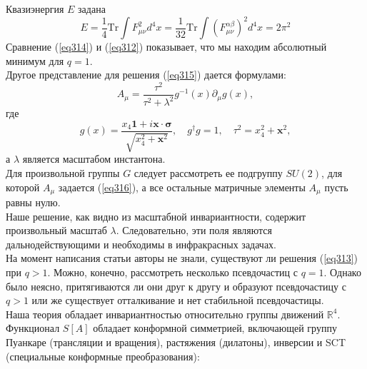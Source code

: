 \documentclass[12pt]{article}
\theoremstyle{definition}
\begin{document}
Квазиэнергия $E$ задана
\begin{equation}\label{eq314}
    E=\frac{1}{4}\text{Tr}\int F^2_{\mu\nu}d^4x=\frac{1}{32}\text{Tr}\int(F^{\alpha\beta}_{\mu\nu})^2d^4x=2\pi^2
\end{equation}
Сравнение (\ref{eq314}) и (\ref{eq312}) показывает, что мы находим абсолютный минимум для $q = 1$.\\
Другое представление для решения (\ref{eq315}) дается формулами:
\begin{equation}\label{eq316}
    A_\mu=\frac{\tau^2}{\tau^2+\lambda^2}g^{-1}(x)\partial_\mu g(x),
\end{equation}
где
\begin{equation}
    g(x)=\frac{x_4\bm{1}+i\bm{x}\cdot\bm{\sigma}}{\sqrt{x_4^2+\bm{x}^2}},\quad g^\dagger g=1,\quad\tau^2=x_4^2+\bm{x}^2,
\end{equation}
а $\lambda$ является масштабом инстантона.\\
Для произвольной группы $G$ следует рассмотреть ее подгруппу $SU(2)$, для которой $A_\mu$ задается (\ref{eq316}), а все остальные матричные элементы $A_\mu$ пусть равны нулю.\\
Наше решение, как видно из масштабной инвариантности, содержит произвольный масштаб $\lambda$. Следовательно, эти поля являются дальнодействующими и необходимы в инфракрасных задачах.\\
На момент написания статьи авторы не знали, существуют ли решения (\ref{eq313}) при $q > 1$. Можно, конечно, рассмотреть несколько псевдочастиц с $q = 1$. Однако было неясно, притягиваются ли они друг к другу и образуют псевдочастицу с $q > 1$ или же существует отталкивание и нет стабильной псевдочастицы.\\
Наша теория обладает инвариантностью относительно группы движений $\mathbb{R}^4$. Функционал $S[A]$ обладает конформной симметрией, включающей группу Пуанкаре (трансляции и вращения), растяжения (дилатоны), инверсии и SCT (специальные конформные преобразования):
\end{document}
